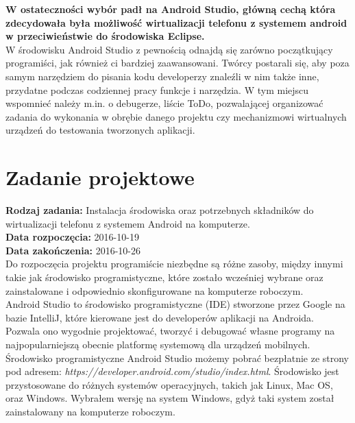 \textbf{W ostateczności wybór padł na Android Studio, główną cechą która zdecydowała była możliwość wirtualizacji telefonu z systemem android w przeciwieństwie do środowiska Eclipse.}
\\

W środowisku Android Studio z pewnością odnajdą się zarówno początkujący programiści, jak również ci bardziej zaawansowani. Twórcy postarali się, aby poza samym narzędziem do pisania kodu developerzy znaleźli w nim także inne, przydatne podczas codziennej pracy funkcje i narzędzia. W tym miejscu wspomnieć należy m.in. o debugerze, liście ToDo, pozwalającej organizować zadania do wykonania w obrębie danego projektu czy mechanizmowi wirtualnych urządzeń do testowania tworzonych aplikacji.




\section{Zadanie projektowe}
\noindent\textbf{Rodzaj zadania:} Instalacja środowiska oraz potrzebnych składników do wirtualizacji telefonu z systemem Android na komputerze. \\

\noindent\textbf{Data rozpoczęcia:} 2016-10-19\\

\noindent\textbf{Data zakończenia:} 2016-10-26\\


Do rozpoczęcia projektu programiście niezbędne są różne zasoby, między innymi takie jak środowisko programistyczne, które zostało wcześniej wybrane oraz zainstalowane i odpowiednio skonfigurowane na komputerze roboczym.
\\

Android Studio to środowisko programistyczne (IDE) stworzone przez Google na bazie IntelliJ, które kierowane jest do developerów aplikacji na Androida. Pozwala ono wygodnie projektować, tworzyć i debugować własne programy na najpopularniejszą obecnie platformę systemową dla urządzeń mobilnych.
\\

Środowisko programistyczne Android Studio możemy pobrać bezpłatnie ze strony pod adresem: \textit{https://developer.android.com/studio/index.html}. Środowisko jest przystosowane do różnych systemów operacyjnych, takich jak Linux, Mac OS, oraz Windows. Wybrałem wersję na system Windows, gdyż taki system został zainstalowany na komputerze roboczym.
\\


